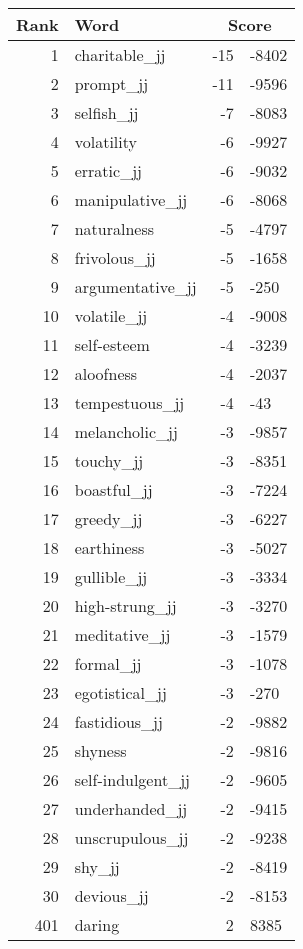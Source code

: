 \begin{longtable}[!htbp]{| rlr@{.}l |}
    \hline
    \textbf{Rank} & \textbf{Word} & \multicolumn{2}{c|}{\textbf{Score}} \\
    \hline
    \endhead
    1 & charitable\_jj & -15 & -8402 \\
    2 & prompt\_jj & -11 & -9596 \\
    3 & selfish\_jj & -7 & -8083 \\
    4 & volatility & -6 & -9927 \\
    5 & erratic\_jj & -6 & -9032 \\
    6 & manipulative\_jj & -6 & -8068 \\
    7 & naturalness & -5 & -4797 \\
    8 & frivolous\_jj & -5 & -1658 \\
    9 & argumentative\_jj & -5 & -250 \\
    10 & volatile\_jj & -4 & -9008 \\
    11 & self-esteem & -4 & -3239 \\
    12 & aloofness & -4 & -2037 \\
    13 & tempestuous\_jj & -4 & -43 \\
    14 & melancholic\_jj & -3 & -9857 \\
    15 & touchy\_jj & -3 & -8351 \\
    16 & boastful\_jj & -3 & -7224 \\
    17 & greedy\_jj & -3 & -6227 \\
    18 & earthiness & -3 & -5027 \\
    19 & gullible\_jj & -3 & -3334 \\
    20 & high-strung\_jj & -3 & -3270 \\
    21 & meditative\_jj & -3 & -1579 \\
    22 & formal\_jj & -3 & -1078 \\
    23 & egotistical\_jj & -3 & -270 \\
    24 & fastidious\_jj & -2 & -9882 \\
    25 & shyness & -2 & -9816 \\
    26 & self-indulgent\_jj & -2 & -9605 \\
    27 & underhanded\_jj & -2 & -9415 \\
    28 & unscrupulous\_jj & -2 & -9238 \\
    29 & shy\_jj & -2 & -8419 \\
    30 & devious\_jj & -2 & -8153 \\
    401 & daring & 2 & 8385 \\

\end{longtable}

